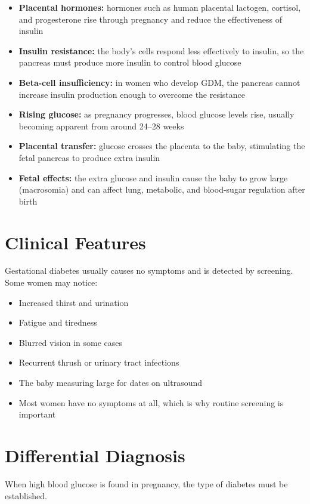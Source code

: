 \begin{itemize}
    \item \textbf{Placental hormones:} hormones such as human placental lactogen, cortisol, and progesterone rise through pregnancy and reduce the effectiveness of insulin
    \item \textbf{Insulin resistance:} the body's cells respond less effectively to insulin, so the pancreas must produce more insulin to control blood glucose
    \item \textbf{Beta-cell insufficiency:} in women who develop GDM, the pancreas cannot increase insulin production enough to overcome the resistance
    \item \textbf{Rising glucose:} as pregnancy progresses, blood glucose levels rise, usually becoming apparent from around 24--28 weeks
    \item \textbf{Placental transfer:} glucose crosses the placenta to the baby, stimulating the fetal pancreas to produce extra insulin
    \item \textbf{Fetal effects:} the extra glucose and insulin cause the baby to grow large (macrosomia) and can affect lung, metabolic, and blood-sugar regulation after birth
\end{itemize}

\section*{Clinical Features}
Gestational diabetes usually causes no symptoms and is detected by screening. Some women may notice:

\begin{itemize}
    \item Increased thirst and urination
    \item Fatigue and tiredness
    \item Blurred vision in some cases
    \item Recurrent thrush or urinary tract infections
    \item The baby measuring large for dates on ultrasound
    \item Most women have no symptoms at all, which is why routine screening is important
\end{itemize}

\section*{Differential Diagnosis}
When high blood glucose is found in pregnancy, the type of diabetes must be established.

